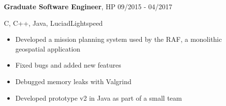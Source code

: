 \documentclass{article}
\begin{document}
\begin{minipage}[t]{0.35\linewidth}
\vspace{0.3cm}
\textbf{Graduate Software Engineer}, HP \hfill 09/2015 - 04/2017

\vspace{0.3cm}
C, C++, Java, LuciadLightspeed

\vspace{0.3cm}
\begin{itemize}
  \item Developed a mission planning system used by the RAF, a monolithic geospatial application
  \item Fixed bugs and added new features
  \item Debugged memory leaks with Valgrind 
  \item Developed prototype v2 in Java as part of a small team
\end{itemize}

\end{minipage}
\hspace{0.5cm}
\end{document}

